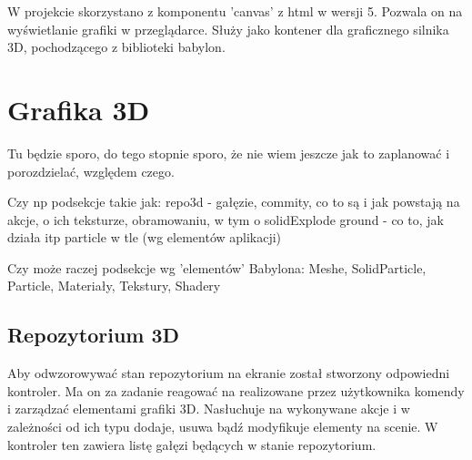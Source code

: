 \documentclass[11pt,a4paper,polish,thesis]{dcsbook}
\begin{document}
	W projekcie skorzystano z komponentu 'canvas' z html w wersji 5. Pozwala on na wyświetlanie grafiki w przeglądarce. Służy jako kontener dla graficznego silnika 3D, pochodzącego z biblioteki babylon. 
	
	\section{Grafika 3D}
	Tu będzie sporo, do tego stopnie sporo, że nie wiem jeszcze jak to zaplanować i porozdzielać, względem czego.
	
	Czy np podsekcje takie jak:
	repo3d - gałęzie, commity, co to są i jak powstają na akcje, o ich teksturze, obramowaniu, w tym o solidExplode
	ground - co to, jak działa itp
	particle w tle
	(wg elementów aplikacji)
	
	Czy może raczej podsekcje wg 'elementów' Babylona:
	Meshe, SolidParticle, Particle, Materiały, Tekstury, Shadery
	
	

	\subsection{Repozytorium 3D}
		Aby odwzorowywać stan repozytorium na ekranie został stworzony odpowiedni kontroler. Ma on za zadanie reagować na realizowane przez użytkownika komendy i zarządzać elementami grafiki 3D. Nasłuchuje na wykonywane akcje i w zależności od ich typu dodaje, usuwa bądź modyfikuje elementy na scenie. W kontroler ten zawiera listę gałęzi będących w stanie repozytorium. %
\end{document}
